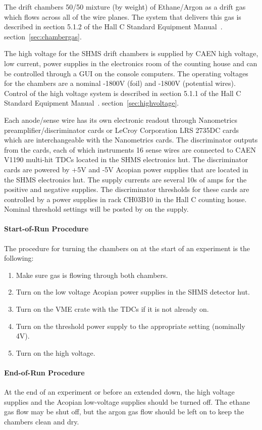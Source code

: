 {The drift chambers 50/50 mixture (by weight) of Ethane/Argon as a
drift gas which
flows across all of the wire planes.  The system that delivers this
gas is described in
\ifdefined\SHMSDCOSP
section 5.1.2 of the Hall C Standard Equipment Manual~\cite{HallCosp}.
\else
section~\ref{sec:chambergas}.
\fi

The high voltage for the SHMS drift chambers is supplied by CAEN
high voltage, low current, power supplies in the electronics room of
the counting
house and can be controlled through a GUI on the console computers.
The operating voltages for the chambers are a nominal -1800V (foil) and -1800V
(potential wires).  Control of the high voltage system is described in
\ifdefined\SHMSDCOSP
section 5.1.1 of the Hall C Standard Equipment Manual~\cite{HallCosp}.
\else
section~\ref{sec:highvoltage}.
\fi

Each anode/sense wire has its own electronic readout through
Nanometrics preamplifier/discriminator cards or LeCroy Corporation LRS
2735DC cards which are interchangeable with the Nanometrics cards.
The discriminator outputs from the cards, each of which instruments 16
sense wires are connected to CAEN V1190 multi-hit TDCs located in the
SHMS electronics hut.
The discriminator cards are powered by +5V and -5V Acopian power
supplies that are
located in the SHMS electronics hut.  The supply currents are several
10s of amps for the positive and negative supplies.
The discriminator thresholds for these cards are controlled by a power
supplies in rack CH03B10 in the Hall C counting house.  Nominal
threshold settings will be posted by on the supply.

\paragraph{Start-of-Run Procedure}
The procedure for turning the chambers on at the start of an
experiment is the following:
\begin{enumerate}
\item Make sure gas is flowing through both chambers.
\item Turn on the low voltage Acopian power supplies in the SHMS detector hut.
\item Turn on the VME crate with the TDCs if it is not already on.
\item Turn on the threshold power supply to the appropriate setting
  (nominally 4V).
\item Turn on the high voltage.
\end{enumerate}

\paragraph{End-of-Run Procedure}
At the end of an experiment or before an extended down, the high
voltage supplies and the Acopian low-voltage supplies should be turned
off.  The ethane gas flow may be shut off, but the argon gas flow
should be left on to keep the chambers clean and dry.

}%
